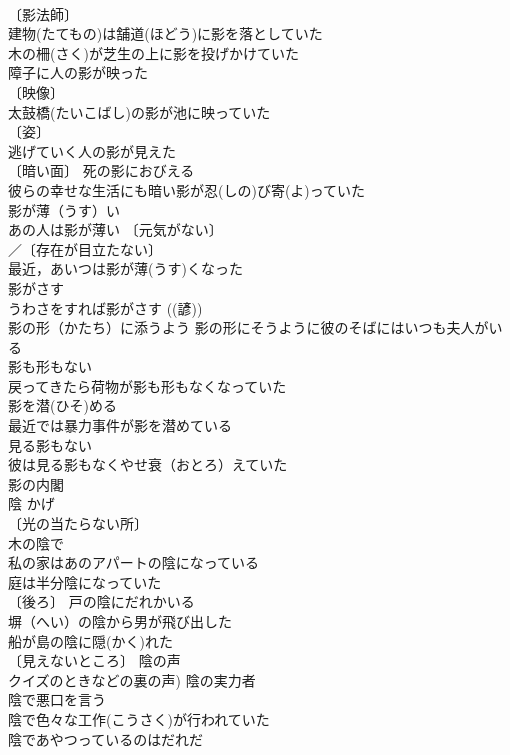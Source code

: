 \documentclass[8pt]{extreport}
\begin{document}
\begin{CJK}{UTF8}{min}
\\	〔影法師〕
\\	建物(たてもの)は舗道(ほどう)に影を落としていた 
\\	木の柵(さく)が芝生の上に影を投げかけていた 
\\	障子に人の影が映った 
\\	〔映像〕
\\	太鼓橋(たいこばし)の影が池に映っていた 
\\	〔姿〕
\\	逃げていく人の影が見えた 
\\	〔暗い面〕 死の影におびえる 
\\	彼らの幸せな生活にも暗い影が忍(しの)び寄(よ)っていた 
\\	影が薄（うす）い 
\\	あの人は影が薄い 〔元気がない〕
\\	／〔存在が目立たない〕
\\	最近，あいつは影が薄(うす)くなった 
\\	影がさす　
\\	うわさをすれば影がさす ((諺)) 
\\	影の形（かたち）に添うよう 影の形にそうように彼のそばにはいつも夫人がいる 
\\	影も形もない 
\\	戻ってきたら荷物が影も形もなくなっていた 
\\	影を潜(ひそ)める 
\\	最近では暴力事件が影を潜めている 
\\	見る影もない 
\\	彼は見る影もなくやせ衰（おとろ）えていた 
\\	影の内閣 
\\	陰	かげ	
\\	〔光の当たらない所〕
\\	木の陰で 
\\	私の家はあのアパートの陰になっている 
\\	庭は半分陰になっていた 
\\	〔後ろ〕 戸の陰にだれかいる 
\\	塀（へい）の陰から男が飛び出した 
\\	船が島の陰に隠(かく)れた 
\\	〔見えないところ〕 陰の声 
\\	クイズのときなどの裏の声) 陰の実力者 
\\	陰で悪口を言う 
\\	陰で色々な工作(こうさく)が行われていた 
\\	陰であやつっているのはだれだ 

\end{CJK}
\end{document}
